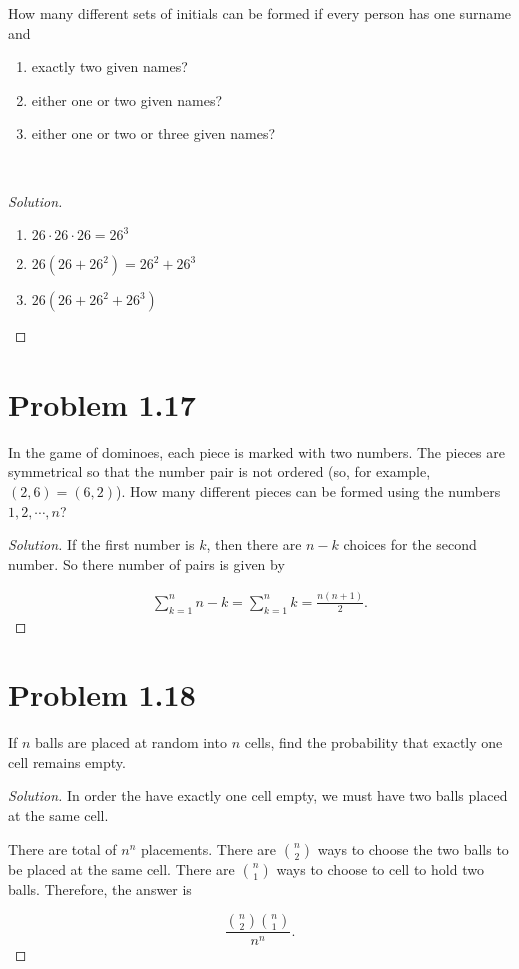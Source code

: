 \documentclass[12pt,letterpaper,reqno]{amsart}
\numberwithin{equation}{subsection}
\begin{document}
How many different sets of initials can be formed if every person has one surname and 
\begin{enumerate}[label=(\alph*),leftmargin=*]
    \item exactly two given names?
    \item either one or two given names?
    \item either one or two or three given names?
\end{enumerate}~\\

\begin{proof}[Solution]~\\
\begin{enumerate}[label=(\alph*),leftmargin=*]
    \item $26 \cdot 26 \cdot 26 = 26^3$
    \item $26(26 + 26^2) = 26^2 + 26^3$
    \item $26(26 + 26^2 + 26^3)$
\end{enumerate}
\end{proof}

\newpage
\section{Problem 1.17}

In the game of dominoes, each piece is marked with two numbers. The pieces are symmetrical so that the number pair is not ordered (so, for example, $(2,6) = (6,2)$). How many different pieces can be formed using the numbers $1, 2, \cdots, n$?

\begin{proof}[Solution]
If the first number is $k$, then there are $n-k$ choices for the second number. So there number of pairs is given by

\begin{align*}
    \sum_{k=1}^n n-k = \sum_{k=1}^n k = \frac{n(n+1)}{2}.
\end{align*}
\end{proof}

\newpage
\section{Problem 1.18}

If $n$ balls are placed at random into $n$ cells, find the probability that exactly one cell remains empty.

\begin{proof}[Solution]
In order the have exactly one cell empty, we must have two balls placed at the same cell.

There are total of $n^n$ placements. There are $\binom{n}{2}$ ways to choose the two balls to be placed at the same cell. There are $\binom{n}{1}$ ways to choose to cell to hold two balls. Therefore, the answer is

\[ \frac{\binom{n}{2} \binom{n}{1}}{n^n}. \]
\end{proof}
\end{document}
